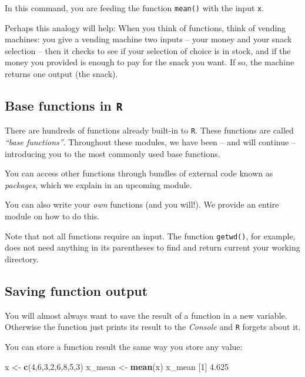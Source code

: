 \documentclass[
]{book}
\newenvironment{Shaded}{\begin{snugshade}}{\end{snugshade}}
\newcommand{\DecValTok}[1]{\textcolor[rgb]{0.00,0.00,0.81}{#1}}
\newcommand{\FloatTok}[1]{\textcolor[rgb]{0.00,0.00,0.81}{#1}}
\newcommand{\KeywordTok}[1]{\textcolor[rgb]{0.13,0.29,0.53}{\textbf{#1}}}
\newcommand{\NormalTok}[1]{#1}
\newcommand{\StringTok}[1]{\textcolor[rgb]{0.31,0.60,0.02}{#1}}
\begin{document}
In this command, you are feeding the function \texttt{mean()} with the input \texttt{x}.

Perhaps this analogy will help: When you think of functions, think of vending machines: you give a vending machine two inputs -- your money and your snack selection -- then it checks to see if your selection of choice is in stock, and if the money you provided is enough to pay for the snack you want. If so, the machine returns one output (the snack).

\hypertarget{base-functions-in-r}{%
\subsection*{\texorpdfstring{Base functions in \texttt{R}}{Base functions in R}}\label{base-functions-in-r}}

There are hundreds of functions already built-in to \texttt{R}. These functions are called \emph{``base functions''}. Throughout these modules, we have been -- and will continue -- introducing you to the most commonly used base functions.

You can access other functions through bundles of external code known as \emph{packages}, which we explain in an upcoming module.

You can also write your \emph{own} functions (and you will!). We provide an entire module on how to do this.

Note that not all functions require an input. The function \texttt{getwd()}, for example, does not need anything in its parentheses to find and return current your working directory.

\hypertarget{saving-function-output}{%
\subsection*{Saving function output}\label{saving-function-output}}

You will almost always want to save the result of a function in a new variable. Otherwise the function just prints its result to the \emph{Console} and \texttt{R} forgets about it.

You can store a function result the same way you store any value:

\begin{Shaded}
\begin{Highlighting}[]
\NormalTok{x <-}\StringTok{ }\KeywordTok{c}\NormalTok{(}\DecValTok{4}\NormalTok{,}\DecValTok{6}\NormalTok{,}\DecValTok{3}\NormalTok{,}\DecValTok{2}\NormalTok{,}\DecValTok{6}\NormalTok{,}\DecValTok{8}\NormalTok{,}\DecValTok{5}\NormalTok{,}\DecValTok{3}\NormalTok{) }
\NormalTok{x_mean <-}\StringTok{ }\KeywordTok{mean}\NormalTok{(x) }
\NormalTok{x_mean}
\NormalTok{[}\DecValTok{1}\NormalTok{] }\FloatTok{4.625}
\end{Highlighting}
\end{Shaded}
\end{document}
